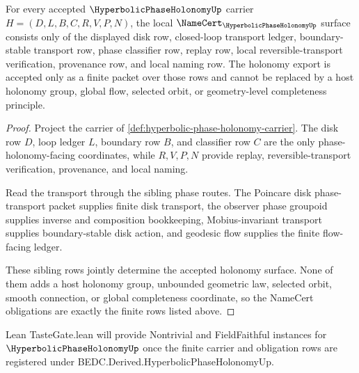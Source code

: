 \begin{theorem}
\label{thm:hyperbolic-phase-holonomy-namecert-obligations}
For every accepted $\HyperbolicPhaseHolonomyUp$ carrier $H=(D,L,B,C,R,V,P,N)$, the local $\NameCert_{\HyperbolicPhaseHolonomyUp}$ surface consists only of the displayed disk row, closed-loop transport ledger, boundary-stable transport row, phase classifier row, replay row, local reversible-transport verification, provenance row, and local naming row. The holonomy export is accepted only as a finite packet over those rows and cannot be replaced by a host holonomy group, global flow, selected orbit, or geometry-level completeness principle.
\end{theorem}
\begin{proof}
Project the carrier of \autoref{def:hyperbolic-phase-holonomy-carrier}. The disk row $D$, loop ledger $L$, boundary row $B$, and classifier row $C$ are the only phase-holonomy-facing coordinates, while $R,V,P,N$ provide replay, reversible-transport verification, provenance, and local naming.

Read the transport through the sibling phase routes. The Poincare disk phase-transport packet supplies finite disk transport, the observer phase groupoid supplies inverse and composition bookkeeping, Mobius-invariant transport supplies boundary-stable disk action, and geodesic flow supplies the finite flow-facing ledger.

These sibling rows jointly determine the accepted holonomy surface. None of them adds a host holonomy group, unbounded geometric law, selected orbit, smooth connection, or global completeness coordinate, so the NameCert obligations are exactly the finite rows listed above.
\end{proof}



Lean TasteGate.lean will provide Nontrivial and FieldFaithful instances for $\HyperbolicPhaseHolonomyUp$ once the finite carrier and obligation rows are registered under BEDC.Derived.HyperbolicPhaseHolonomyUp.


